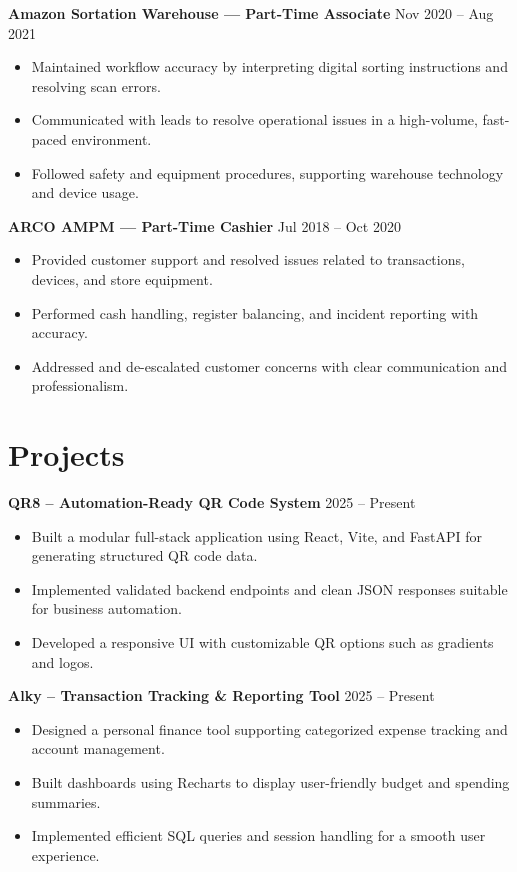 \documentclass[a4paper,10pt]{article}
\newcommand{\dateright}[1]{\hfill {\small\textnormal{#1}}}
\begin{document}
\textbf{Amazon Sortation Warehouse — Part-Time Associate} \dateright{Nov 2020 – Aug 2021}
\begin{itemize}
  \item Maintained workflow accuracy by interpreting digital sorting instructions and resolving scan errors.
  \item Communicated with leads to resolve operational issues in a high-volume, fast-paced environment.
  \item Followed safety and equipment procedures, supporting warehouse technology and device usage.
\end{itemize}

\textbf{ARCO AMPM — Part-Time Cashier} \dateright{Jul 2018 – Oct 2020}
\begin{itemize}
  \item Provided customer support and resolved issues related to transactions, devices, and store equipment.
  \item Performed cash handling, register balancing, and incident reporting with accuracy.
  \item Addressed and de-escalated customer concerns with clear communication and professionalism.
\end{itemize}

\section*{Projects}

\textbf{QR8 – Automation-Ready QR Code System} \dateright{2025 – Present}
\begin{itemize}
  \item Built a modular full-stack application using React, Vite, and FastAPI for generating structured QR code data.
  \item Implemented validated backend endpoints and clean JSON responses suitable for business automation.
  \item Developed a responsive UI with customizable QR options such as gradients and logos.
\end{itemize}

\textbf{Alky – Transaction Tracking \& Reporting Tool} \dateright{2025 – Present}
\begin{itemize}
  \item Designed a personal finance tool supporting categorized expense tracking and account management.
  \item Built dashboards using Recharts to display user-friendly budget and spending summaries.
  \item Implemented efficient SQL queries and session handling for a smooth user experience.
\end{itemize}
\end{document}
